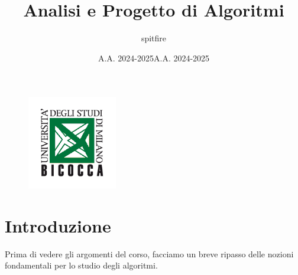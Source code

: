 \documentclass[12pt]{article}
\title{Analisi e Progetto di Algoritmi}
\author{spitfire}
\date{A.A. 2024-2025}
\begin{document}
\begin{figure}
    \centering
    \includegraphics[width=0.35\textwidth]{Images/Logo scienze bicocca.png}
\end{figure}

\vspace{10cm}
\date{A.A. 2024-2025}


\maketitle

\newpage

\tableofcontents
\newpage

\section{Introduzione}
Prima di vedere gli argomenti del corso, facciamo un breve ripasso delle nozioni fondamentali per
lo studio degli algoritmi.
\end{document}
